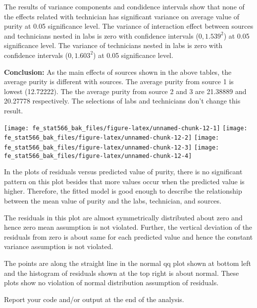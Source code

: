 \documentclass[12pt,]{article}
\begin{document}
The results of variance components and condidence intervals show that
none of the effects related with technician has significant variance on
average value of purity at 0.05 significance level. The variance of
interaction effect between sources and technicians nested in labs is
zero with confidence intervals (\(0,1.539^2\)) at 0.05 significance
level. The variance of technicians nested in labs is zero with
confidence intervals (\(0,1.603^2\)) at 0.05 significance level.

\textbf{Conclusion:} As the main effects of sources shown in the above
tables, the average purity is different with sources. The average purity
from source 1 is lowest (12.72222). The the average purity from source 2
and 3 are 21.38889 and 20.27778 respectively. The selections of labs and
technicians don't change this result.

\texttt{[image: fe\_stat566\_bak\_files/figure-latex/unnamed-chunk-12-1]}
\texttt{[image: fe\_stat566\_bak\_files/figure-latex/unnamed-chunk-12-2]}
\texttt{[image: fe\_stat566\_bak\_files/figure-latex/unnamed-chunk-12-3]}
\texttt{[image: fe\_stat566\_bak\_files/figure-latex/unnamed-chunk-12-4]}

In the plots of residuals versus predicted value of purity, there is no
significant pattern on this plot besides that more values occur when the
predicted value is higher. Therefore, the fitted model is good enough to
describe the relationship between the mean value of purity and the labs,
technician, and sources.

The residuals in this plot are almost symmetrically distributed about
zero and hence zero mean assumption is not violated. Further, the
vertical deviation of the residuals from zero is about same for each
predicted value and hence the constant variance assumption is not
violated.

The points are along the straight line in the normal qq plot shown at
bottom left and the histogram of residuals shown at the top right is
about normal. These plots show no violation of normal distribution
assumption of residuals.

\textcolor[rgb]{0.7,0.7,0.7}{Report your code and/or output at the end of the analysis.}
\end{document}
